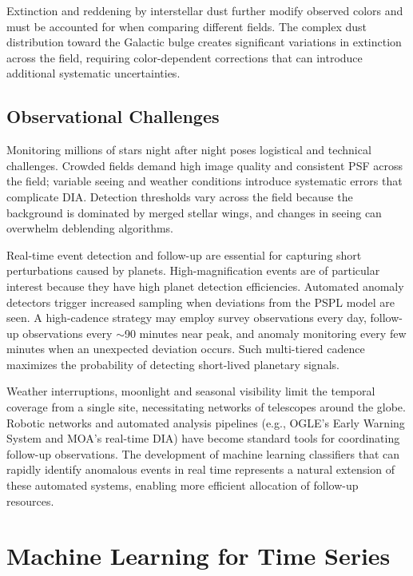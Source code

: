 Extinction and reddening by interstellar dust further modify observed colors and must be accounted for when comparing different fields. The complex dust distribution toward the Galactic bulge creates significant variations in extinction across the field, requiring color-dependent corrections that can introduce additional systematic uncertainties.

\subsection{Observational Challenges}
\label{sec:obs_challenges}

Monitoring millions of stars night after night poses logistical and technical challenges. Crowded fields demand high image quality and consistent PSF across the field; variable seeing and weather conditions introduce systematic errors that complicate DIA. Detection thresholds vary across the field because the background is dominated by merged stellar wings, and changes in seeing can overwhelm deblending algorithms.

Real-time event detection and follow-up are essential for capturing short perturbations caused by planets. High-magnification events are of particular interest because they have high planet detection efficiencies. Automated anomaly detectors trigger increased sampling when deviations from the PSPL model are seen. A high-cadence strategy may employ survey observations every day, follow-up observations every $\sim$90 minutes near peak, and anomaly monitoring every few minutes when an unexpected deviation occurs. Such multi-tiered cadence maximizes the probability of detecting short-lived planetary signals.

Weather interruptions, moonlight and seasonal visibility limit the temporal coverage from a single site, necessitating networks of telescopes around the globe. Robotic networks and automated analysis pipelines (e.g., OGLE's Early Warning System and MOA's real-time DIA) have become standard tools for coordinating follow-up observations. The development of machine learning classifiers that can rapidly identify anomalous events in real time represents a natural extension of these automated systems, enabling more efficient allocation of follow-up resources.

\section{Machine Learning for Time Series}
\label{sec:ml_methods}


